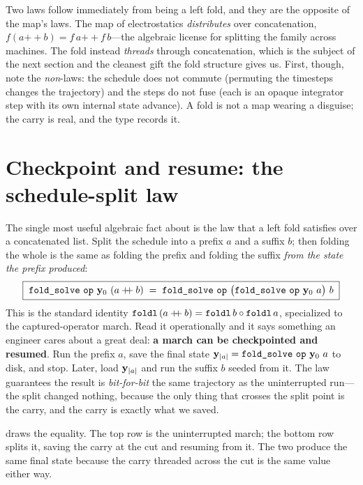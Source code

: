 Two laws follow immediately from  being a left fold, and they are
the opposite of the map's laws. The map of electrostatics \emph{distributes} over
concatenation, $f(a \mathbin{+\!\!+} b) = f\,a \mathbin{+\!\!+} f\,b$---the algebraic
license for splitting the family across machines. The fold instead
\emph{threads} through concatenation, which is the subject of the next section and
the cleanest gift the fold structure gives us. First, though, note the
\emph{non}-laws: the schedule does not commute (permuting the timesteps changes the
trajectory) and the steps do not fuse (each is an opaque integrator step with its
own internal state advance). A fold is not a map wearing a disguise; the carry is
real, and the type records it.

\section{Checkpoint and resume: the schedule-split law}
\label{sec:checkpoint}

The single most useful algebraic fact about  is the law that a
left fold satisfies over a concatenated list. Split the schedule into a prefix
$a$ and a suffix $b$; then folding the whole is the same as folding the prefix and
folding the suffix \emph{from the state the prefix produced}:
\begin{equation}
  \boxed{\;\code{fold\_solve}\ \code{op}\ \vy_0\ (a \mathbin{+\!\!+} b)
  \;=\;
  \code{fold\_solve}\ \code{op}\ \bigl(\code{fold\_solve}\ \code{op}\ \vy_0\ a\bigr)\ b\;}
  \label{eq:schedule-split}
\end{equation}
This is the standard identity $\texttt{foldl}\,(a \mathbin{+\!\!+} b) = \texttt{foldl}\,b
\circ \texttt{foldl}\,a$, specialized to the captured-operator march. Read it
operationally and it says something an engineer cares about a great deal:
\textbf{a march can be checkpointed and resumed}. Run the prefix $a$, save the
final state $\mathbf{y}_{|a|} = \texttt{fold\_solve}\ \texttt{op}\ \mathbf{y}_0\ a$ to disk, and stop.
Later, load $\mathbf{y}_{|a|}$ and run the suffix $b$ seeded from it. The law guarantees
the result is \emph{bit-for-bit} the same trajectory as the uninterrupted run---the
split changed nothing, because the only thing that crosses the split point is the
carry, and the carry is exactly what we saved.

 draws the equality. The top row is the uninterrupted march;
the bottom row splits it, saving the carry at the cut and resuming from it. The two
produce the same final state because the carry threaded across the cut is the same
value either way.

